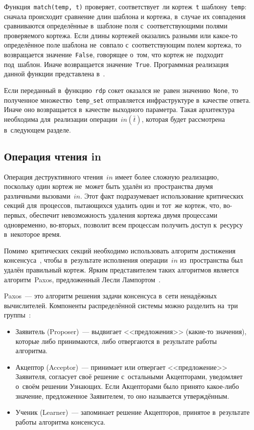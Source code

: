 Функция~\texttt{match(temp, t)} проверяет, соответствует~ли кортеж~\texttt{t} шаблону~\texttt{temp}: сначала происходит сравнение длин шаблона и кортежа, в~случае их совпадения сравниваются определённые в~шаблоне поля с~соответствующими полями проверяемого кортежа. Если длины кортежей оказались разными или какое-то определённое поле шаблона не~совпало с~соответствующим полем кортежа, то возвращается значение~\texttt{False}, говорящее о~том, что кортеж не~подходит под~шаблон. Иначе возвращается значение~\texttt{True}. Программная реализация данной функции представлена в~\autocite{mybts}.

Если переданный в~функцию~\texttt{rdp} сокет оказался не~равен значению~\texttt{None}, то полученное множество~\texttt{temp_set} отправляется инфраструктуре в~качестве ответа. Иначе оно возвращается в~качестве выходного параметра. Такая архитектура необходима для~реализации операции~$in(\bar t)$, которая будет рассмотрена в~следующем разделе.


\subsection{Операция чтения in}\label{subsec:8}
Операция деструктивного чтения~$in$ имеет более сложную реализацию, поскольку один кортеж не~может быть удалён из~пространства двумя различными вызовами~$in$. Этот факт подразумевает использование критических секций для~процессов, пытающихся удалить один и тот~же кортеж, что, во-первых, обеспечит невозможность удаления кортежа двумя процессами одновременно, во-вторых, позволит всем процессам получить доступ к~ресурсу в~некоторое время.

Помимо~критических секций необходимо использовать алгоритм достижения консенсуса~\autocite{paxos}, чтобы в~результате исполнения операции~$in$ из~пространства был удалён правильный кортеж. Ярким представителем таких алгоритмов является алгоритм~Paxos, предложенный Лесли Лампортом~\autocite{Lamport}.

Paxos~--- это алгоритм решения задачи консенсуса в~сети ненадёжных вычислителей. Компоненты распределённой системы можно разделить на~три группы~\autocite{paxos}:
\begin{itemize}
	\item Заявитель (Proposer)~--- выдвигает <<предложения>> (какие-то значения), которые либо принимаются, либо отвергаются в~результате работы алгоритма.
	\item Акцептор (Acceptor)~--- принимает или отвергает <<предложение>> Заявителя, согласует своё решение с~остальными Акцепторами, уведомляет о~своём решении Узнающих. Если Акцепторами было принято какое-либо значение, предложенное Заявителем, то оно называется утверждённым.
	\item Ученик (Learner)~--- запоминает решение Акцепторов, принятое в~результате работы алгоритма консенсуса.
\end{itemize}


